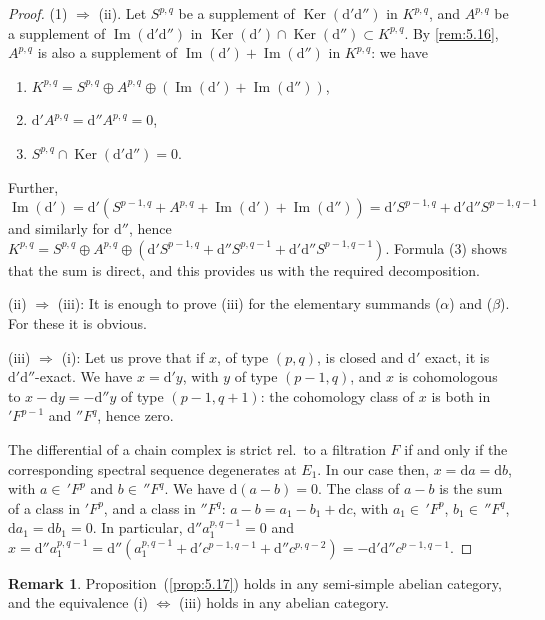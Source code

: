 \documentclass[11pt]{amsart}
\theoremstyle{plain}
\theoremstyle{definition}
\newtheorem{remark}[theorem]{Remark}
\DeclareMathOperator{\Ker}{Ker}
\DeclareMathOperator{\Imop}{Im}
\newcommand{\dd}{\mathrm{d}}
\begin{document}
\begin{proof}
(1) $\Rightarrow$ (ii). Let $S^{p,q}$ be a supplement of $\Ker(\dd'\dd'')$ in $K^{p,q}$, and $A^{p,q}$ be a supplement of $\Imop(\dd'\dd'')$ in $\Ker(\dd') \cap \Ker(\dd'') \subset K^{p,q}$. By \ref{rem:5.16}, $A^{p,q}$ is also a supplement of $\Imop(\dd') + \Imop(\dd'')$ in $K^{p,q}$: we have
\begin{enumerate}
\item[(1)] $K^{p,q} = S^{p,q} \oplus A^{p,q} \oplus (\Imop(\dd') + \Imop(\dd''))$,
\item[(2)] $\dd' A^{p,q} = \dd'' A^{p,q} = 0$,
\item[(3)] $S^{p,q} \cap \Ker(\dd'\dd'') = 0$.
\end{enumerate}
Further, $\Imop(\dd') = \dd'(S^{p-1,q} + A^{p,q} + \Imop(\dd') + \Imop(\dd'')) = \dd' S^{p-1,q} + \dd'\dd'' S^{p-1,q-1}$ and similarly for $\dd''$, hence $K^{p,q} = S^{p,q} \oplus A^{p,q} \oplus (\dd' S^{p-1,q} + \dd'' S^{p,q-1} + \dd'\dd'' S^{p-1,q-1})$. Formula (3) shows that the sum is direct, and this provides us with the required decomposition.

(ii) $\Rightarrow$ (iii): It is enough to prove (iii) for the elementary summands ($\alpha$) and ($\beta$). For these it is obvious.

(iii) $\Rightarrow$ (i): Let us prove that if $x$, of type $(p,q)$, is closed and $\dd'$ exact, it is $\dd'\dd''$-exact. We have $x = \dd' y$, with $y$ of type $(p-1,q)$, and $x$ is cohomologous to $x - \dd y = -\dd'' y$ of type $(p-1,q+1)$: the cohomology class of $x$ is both in $'F^{p-1}$ and $''F^{q}$, hence zero.

The differential of a chain complex is strict rel.\ to a filtration $F$ if and only if the corresponding spectral sequence degenerates at $E_{1}$. In our case then, $x = \dd a = \dd b$, with $a \in \, 'F^{p}$ and $b \in \, ''F^{q}$. We have $\dd(a-b) = 0$. The class of $a-b$ is the sum of a class in $'F^{p}$, and a class in $''F^{q}$: $a - b = a_{1} - b_{1} + \dd c$, with $a_{1} \in \, 'F^{p}$, $b_{1} \in \, ''F^{q}$, $\dd a_{1} = \dd b_{1} = 0$. In particular, $\dd'' a^{p,q-1}_{1} = 0$ and $x = \dd'' a^{p,q-1}_{1} = \dd''(a^{p,q-1}_{1} + \dd' c^{p-1,q-1} + \dd'' c^{p,q-2}) = -\dd'\dd'' c^{p-1,q-1}$.
\end{proof}

\begin{remark}\label{rem:5.18}
Proposition~(\ref{prop:5.17}) holds in any semi-simple abelian category, and the equivalence (i) $\Leftrightarrow$ (iii) holds in any abelian category.
\end{remark}
\end{document}
